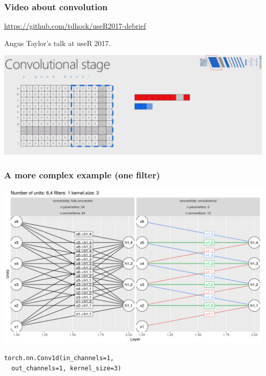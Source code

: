\documentclass{beamer}
\begin{document}
\begin{frame}
  \frametitle{Video about convolution}
  \url{https://github.com/tdhock/useR2017-debrief}

  Angus Taylor's talk at useR 2017.

  \includegraphics[width=\textwidth]{screenshot-conv} 
\end{frame}

\begin{frame}
  \frametitle{A more complex example (one filter)}
  \includegraphics[width=\textwidth]{figure-convolutional-filters-6-3-1}

\begin{verbatim}
torch.nn.Conv1d(in_channels=1, 
  out_channels=1, kernel_size=3)
\end{verbatim}
  
\end{frame}
\end{document}
